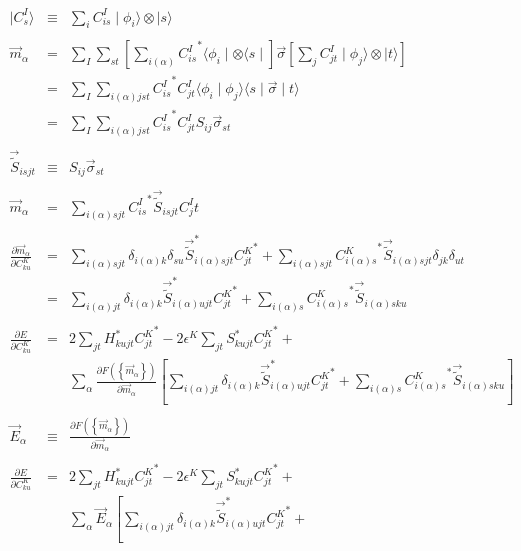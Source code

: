 \documentclass{article}
\begin{document}
\begin{eqnarray*}
\mid C^I_s \rangle & \equiv & \sum_i C^I_{is} \mid \phi_{i} \rangle \otimes \mid s \rangle \\ 
\\
\vec{m}_\alpha & = & \sum_I \sum_{st} \left[ \sum_{i(\alpha)} {C^I_{is}}^*  \langle \phi_{i} \mid \otimes \langle s \mid \right] \vec{\sigma}
    \left[  \sum_{j} C^I_{jt} \mid \phi_{j} \rangle \otimes \mid t \rangle \right] \\
 & = & \sum_I \sum_{i(\alpha)jst} {C^I_{is}}^* C^I_{jt} \langle \phi_i \mid \phi_j \rangle \langle s \mid \vec{\sigma} \mid t \rangle \\
 & = & \sum_I \sum_{i(\alpha)jst} {C^I_{is}}^* C^I_{jt} S_{ij} \vec{\sigma}_{st} \\
\\
\vec{\tilde{S}}_{isjt} & \equiv & S_{ij} \vec{\sigma}_{st} \\
\\
\vec{m}_\alpha & = & \sum_{i(\alpha)sjt} {C^I_{is}}^* \vec{\tilde{S}}_{isjt} C^I_jt \\
\\
\frac{\partial \vec{m}_\alpha}{\partial C^K_{ku}} & = & 
   \sum_{i(\alpha)sjt} \delta_{i(\alpha)k} \delta_{su} \vec{\tilde{S}}_{i(\alpha)sjt}^* {C^K_{jt}}^* +
         \sum_{i(\alpha)sjt} {C^K_{i(\alpha)s}}^* \vec{\tilde{S}}_{i(\alpha)sjt} \delta_{jk} \delta_{ut}\\
& = & \sum_{i(\alpha)jt} \delta_{i(\alpha)k} \vec{\tilde{S}}_{i(\alpha)ujt}^* {C^K_{jt}}^* +
      \sum_{i(\alpha)s} {C^K_{i(\alpha)s}}^* \vec{\tilde{S}}_{i(\alpha)sku}  \\
\\
\frac{\partial E}{\partial C^K_{ku}} & = &
  2 \sum_{jt} H_{kujt}^* {C^K_{jt}}^* - 2 \epsilon^K \sum_{jt} S_{kujt}^* {C^K_{jt}}^* + \\
  &&  \sum_\alpha \frac{\partial F( \left\{ \vec{m}_\alpha \right\} )}{\partial \vec{m}_\alpha}  
   \left[ \sum_{i(\alpha)jt} \delta_{i(\alpha)k} \vec{\tilde{S}}_{i(\alpha)ujt}^* {C^K_{jt}}^* +
      \sum_{i(\alpha)s} {C^K_{i(\alpha)s}}^* \vec{\tilde{S}}_{i(\alpha)sku}  \right] \\
\\
\vec{E}_{\alpha} & \equiv & \frac{\partial F( \left\{ \vec{m}_\alpha \right\} )}{\partial \vec{m}_\alpha} \\
\\
\frac{\partial E}{\partial C^K_{ku}} & = &
  2 \sum_{jt} H_{kujt}^* {C^K_{jt}}^* - 2 \epsilon^K \sum_{jt} S_{kujt}^* {C^K_{jt}}^* + \\
  &&  \sum_\alpha \vec{E}_{\alpha} \left[ \sum_{i(\alpha)jt} \delta_{i(\alpha)k} \vec{\tilde{S}}_{i(\alpha)ujt}^* {C^K_{jt}}^* +

\end{eqnarray*}
\end{document}
